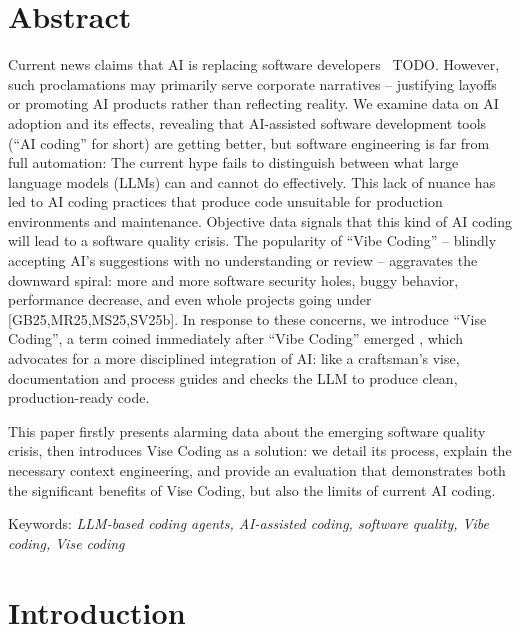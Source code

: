 \documentclass[twocolumn]{article}
\begin{document}
\setlength{\belowcaptionskip}{-10pt}

\section{Abstract}
Current news claims that AI is replacing software developers~\cite{Lanz23} TODO.
However, such proclamations may primarily serve corporate narratives -- justifying layoffs or promoting AI products rather than reflecting reality.
We examine data on AI adoption and its effects, revealing that AI-assisted software development tools (``AI coding'' for short) are getting better,
but software engineering is far from full automation: 
The current hype fails to distinguish between what large language models (LLMs) can and cannot do effectively.
This lack of nuance has led to AI coding practices that produce code unsuitable for production environments and maintenance.
Objective data signals that this kind of AI coding will lead to a software quality crisis.
The popularity of ``Vibe Coding'' -- blindly accepting AI's suggestions with no understanding or review -- aggravates the downward spiral:
more and more software security holes, buggy behavior, performance decrease, and even whole projects going under [GB25,MR25,MS25,SV25b]. 
In response to these concerns, we introduce ``Vise Coding'', a term coined immediately after ``Vibe Coding'' emerged \cite{DF25},
which advocates for a more disciplined integration of AI:
like a craftsman's vise, documentation and process guides and checks the LLM to produce clean, production-ready code.

This paper firstly presents alarming data about the emerging software quality crisis,
then introduces Vise Coding as a solution: we detail its process, explain the necessary context engineering,
and provide an evaluation that demonstrates both the significant benefits of Vise Coding,
but also the limits of current AI coding.

Keywords: {\em LLM-based coding agents, AI-assisted coding, software quality, Vibe coding, Vise coding}

\section{Introduction}
\end{document}
